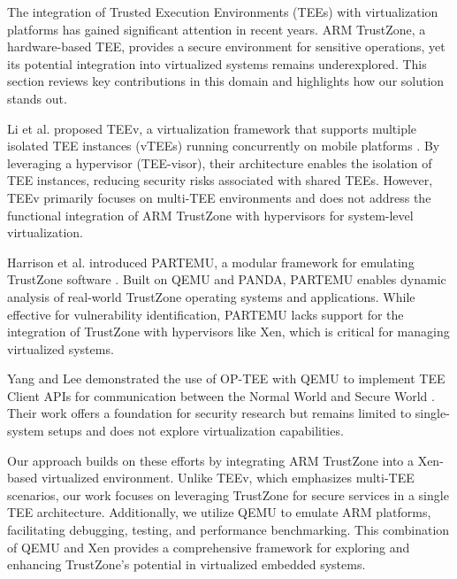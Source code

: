 \documentclass[acmtog]{acmart}
\begin{document}
The integration of Trusted Execution Environments (TEEs) with virtualization platforms has gained significant attention in recent years. ARM TrustZone, a hardware-based TEE, provides a secure environment for sensitive operations, yet its potential integration into virtualized systems remains underexplored. This section reviews key contributions in this domain and highlights how our solution stands out.

Li et al. proposed TEEv, a virtualization framework that supports multiple isolated TEE instances (vTEEs) running concurrently on mobile platforms \cite{10.1145/3313808.3313810}. By leveraging a hypervisor (TEE-visor), their architecture enables the isolation of TEE instances, reducing security risks associated with shared TEEs. However, TEEv primarily focuses on multi-TEE environments and does not address the functional integration of ARM TrustZone with hypervisors for system-level virtualization.\cite{7005255} \cite{10.1007/978-3-642-32298-3_1}

Harrison et al. introduced PARTEMU, a modular framework for emulating TrustZone software \cite{247658}. Built on QEMU and PANDA, PARTEMU enables dynamic analysis of real-world TrustZone operating systems and applications. While effective for vulnerability identification, PARTEMU lacks support for the integration of TrustZone with hypervisors like Xen, which is critical for managing virtualized systems.

Yang and Lee demonstrated the use of OP-TEE with QEMU to implement TEE Client APIs for communication between the Normal World and Secure World \cite{10.1145/3426020.3426113}. Their work offers a foundation for security research but remains limited to single-system setups and does not explore virtualization capabilities.\cite{10274941}\cite{10.1145/3426020.3426113}\cite{8352425}

Our approach builds on these efforts by integrating ARM TrustZone into a Xen-based virtualized environment. Unlike TEEv, which emphasizes multi-TEE scenarios, our work focuses on leveraging TrustZone for secure services in a single TEE architecture. Additionally, we utilize QEMU to emulate ARM platforms, facilitating debugging, testing, and performance benchmarking. This combination of QEMU and Xen provides a comprehensive framework for exploring and enhancing TrustZone's potential in virtualized embedded systems.
\end{document}
